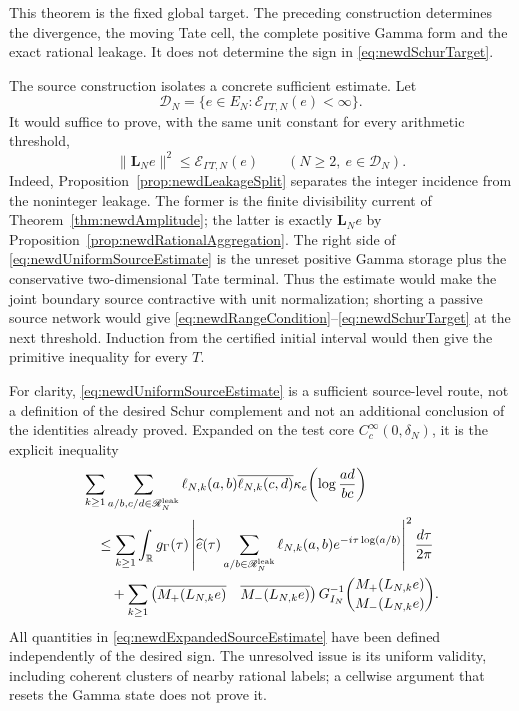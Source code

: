 \documentclass[11pt]{amsart}
\theoremstyle{definition}
\theoremstyle{remark}
\newcommand{\R}{\mathbb R}
\begin{document}
This theorem is the fixed global target.  The preceding construction
determines the divergence, the moving Tate cell, the complete positive Gamma
form and the exact rational leakage.  It does not determine the sign in
\eqref{eq:newdSchurTarget}.

The source construction isolates a concrete sufficient estimate.  Let
\[
 \mathscr D_N=
 \{e\in E_N:\mathcal E_{\Gamma T,N}(e)<\infty\}.
\]
It would suffice to prove, with the same unit constant for every arithmetic
threshold,
\begin{equation}\label{eq:newdUniformSourceEstimate}
 \|\mathbf L_Ne\|^2\leq\mathcal E_{\Gamma T,N}(e)
 \qquad(N\geq2,\ e\in\mathscr D_N).
\end{equation}
Indeed, Proposition~\ref{prop:newdLeakageSplit} separates the integer
incidence from the noninteger leakage.  The former is the finite
divisibility current of Theorem~\ref{thm:newdAmplitude}; the latter is
exactly $\mathbf L_Ne$ by
Proposition~\ref{prop:newdRationalAggregation}.  The right side of
\eqref{eq:newdUniformSourceEstimate} is the unreset positive Gamma storage
plus the conservative two-dimensional Tate terminal.  Thus the estimate
would make the joint boundary source contractive with unit normalization;
shorting a passive source network would give
\eqref{eq:newdRangeCondition}--\eqref{eq:newdSchurTarget} at the next
threshold.  Induction from the certified initial interval would then give
the primitive inequality for every $T$.

For clarity, \eqref{eq:newdUniformSourceEstimate} is a sufficient
source-level route, not a definition of the desired Schur complement and not
an additional conclusion of the identities already proved.  Expanded on the
test core $C_c^\infty(0,\delta_N)$, it is the explicit inequality
\begin{align}
 &\sum_{k\geq1}
 \sum_{a/b,c/d\in\mathscr R_N^{\rm leak}}
 \ell_{N,k}(a,b)\overline{\ell_{N,k}(c,d)}
 \kappa_e\!\left(\log\frac{ad}{bc}\right)
 \notag\\
 &\quad\leq
 \sum_{k\geq1}\int_\R g_\Gamma(\tau)
 \left|\widehat e(\tau)
   \sum_{a/b\in\mathscr R_N^{\rm leak}}
       \ell_{N,k}(a,b)e^{-i\tau\log(a/b)}\right|^2
 \frac{d\tau}{2\pi}
 \notag\\
 &\qquad+
 \sum_{k\geq1}
 \begin{pmatrix}
  \overline{M_+(L_{N,k}e)}&\overline{M_-(L_{N,k}e)}
 \end{pmatrix}
 G_{I_N}^{-1}
 \binom{M_+(L_{N,k}e)}{M_-(L_{N,k}e)}.
 \label{eq:newdExpandedSourceEstimate}
\end{align}
All quantities in \eqref{eq:newdExpandedSourceEstimate} have been defined
independently of the desired sign.  The unresolved issue is its uniform
validity, including coherent clusters of nearby rational labels; a cellwise
argument that resets the Gamma state does not prove it.
\end{document}
